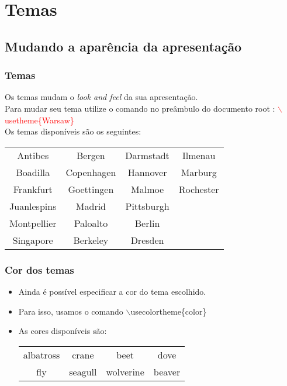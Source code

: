 \section{Temas}
\subsection{Mudando a aparência da apresentação}

\begin{frame}
  \frametitle{Temas}
  Os temas mudam o \textit{look and feel} da sua apresentação. \\

  Para mudar seu tema utilize o comando no preâmbulo do documento root : \newline \newline
  \textcolor{red}{$\backslash$usetheme\{Warsaw\}}
  \\
  Os temas disponíveis são os seguintes:
  \newline
  \newline

  \begin{tabular}{cccc}
      Antibes     &  Bergen       &  Darmstadt   &   Ilmenau  \\
      Boadilla    &  Copenhagen   &  Hannover    &   Marburg \\
      Frankfurt   &  Goettingen   &  Malmoe      &   Rochester \\
      Juanlespins &  Madrid       &  Pittsburgh   \\
      Montpellier &  Paloalto     &  Berlin       \\
      Singapore   &  Berkeley     &  Dresden      \\
  \end{tabular}
\end{frame}


\begin{frame}
  \frametitle{Cor dos temas}

  \begin{itemize}[<+->]
     \item Ainda é possível especificar a cor do tema escolhido.
     \item Para isso, usamos o comando $\backslash$usecolortheme\{color\}
     \item As cores disponíveis são:
        \begin{tabular}{cccc}
          albatross & crane & beet & dove \\
          fly & seagull & wolverine & beaver\\
        \end{tabular}
  \end{itemize}

\end{frame}
